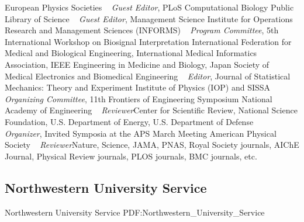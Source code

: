    \newline
European Physics Societies
\newline
~
\Gap
{}
\textit{Guest Editor},
    PLoS Computational Biology
    \newline
Public Library of Science
\newline
~
\Gap
{}
\textit{Guest Editor},
    Management Science
    \newline
Institute for Operations Research and Management Sciences (INFORMS)
\newline
~
\Gap
{}
\textit{Program Committee},
    5th International Workshop on Biosignal Interpretation
    \newline
International Federation for Medical and Biological Engineering, International Medical Informatics Association, IEEE Engineering in Medicine and Biology, Japan Society of Medical Electronics and Biomedical Engineering
\newline
~
\Gap
{}
\textit{Editor},
    Journal of Statistical Mechanics: Theory and Experiment
    \newline
Institute of Physics (IOP) and SISSA
\newline
~
\Gap
{}
\textit{Organizing Committee},
    11th Frontiers of Engineering Symposium
    \newline
National Academy of Engineering
\newline
~
\Gap
{}
\textit{Reviewer}Center for Scientific Review, National Science Foundation, U.S. Department of Energy, U.S. Department of Defense
\newline
~
\Gap
{}
\textit{Organizer},
    Invited Symposia at the APS March Meeting 
    \newline
American Physical Society
\newline
~
\Gap
{}
\textit{Reviewer}Nature, Science, JAMA, PNAS, Royal Society journals, AIChE Journal, Physical Review journals, PLOS journals, BMC journals, etc.
\newline
~
\Gap
\vspace*{0.2cm}\subsection
{Northwestern University Service}
{Northwestern University Service}
{PDF:Northwestern_University_Service}

